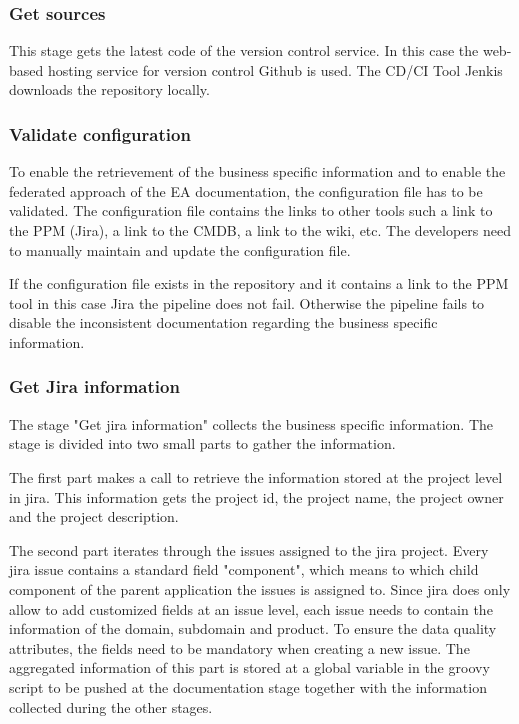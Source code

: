 \subsubsection{Get sources}
This stage gets the latest code of the version control service. In this case the web-based hosting service for version control Github is used. The CD/CI Tool Jenkis downloads the repository locally. 

\subsubsection{Validate configuration}
To enable the retrievement of the business specific information and to enable the federated approach of the EA documentation, the configuration file has to be validated. The configuration file contains the links to other tools such a link to the PPM (Jira), a link to the CMDB, a link to the wiki, etc. The developers need to manually maintain and update the configuration file.

If the configuration file exists in the repository and it contains a link to the PPM tool in this case Jira the pipeline does not fail. Otherwise the pipeline fails to disable the inconsistent documentation regarding the business specific information.

\subsubsection{Get Jira information}\label{subsubsection:getjirainformation}
The stage "Get jira information" collects the business specific information. The stage is divided into two small parts to gather the information.

The first part makes a call to retrieve the information stored at the project level in jira. This information gets the project id, the project name, the project owner and the project description. 

The second part iterates through the issues assigned to the jira project. Every jira issue contains a standard field "component", which means to which child component of the parent application the issues is assigned to. Since jira does only allow to add customized fields at an issue level, each issue needs to contain the information of the domain, subdomain and product. To ensure the data quality attributes, the fields need to be mandatory when creating a new issue. The aggregated information of this part is stored at a global variable in the groovy script to be pushed at the documentation stage together with the information collected during the other stages.

